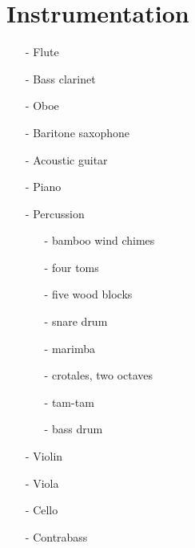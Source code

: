 \section{Instrumentation}

\begin{itemize}
    \item[-] Flute
    \item[-] Bass clarinet
    \item[-] Oboe
    \item[-] Baritone saxophone
    \item[-] Acoustic guitar
    \item[-] Piano
    \item[-] Percussion
        \begin{itemize}
            \item[-] bamboo wind chimes
            \item[-] four toms
            \item[-] five wood blocks
            \item[-] snare drum
            \item[-] marimba
            \item[-] crotales, two octaves
            \item[-] tam-tam
            \item[-] bass drum
        \end{itemize}
    \item[-] Violin
    \item[-] Viola
    \item[-] Cello
    \item[-] Contrabass
\end{itemize}
